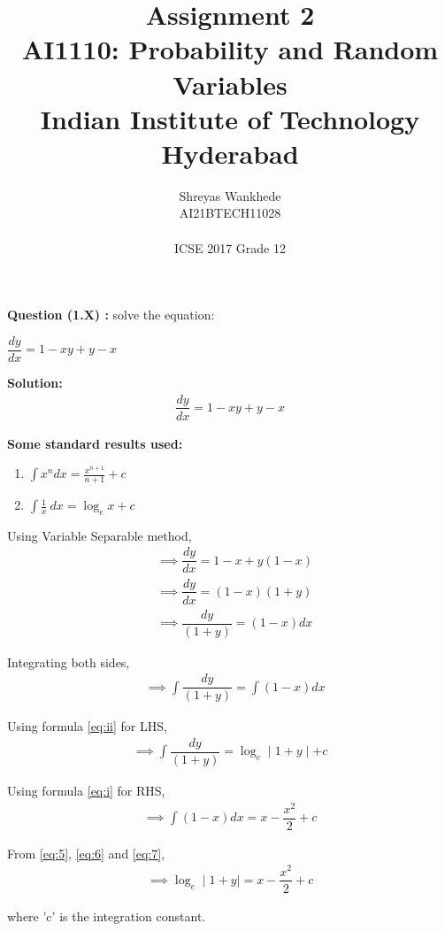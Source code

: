 \documentclass[journal,12pt, two column]{IEEEtran}
\title{Assignment 2\\ \Large AI1110: Probability and Random Variables \\ \large Indian Institute of Technology Hyderabad}
\author{Shreyas Wankhede \\ \normalsize AI21BTECH11028 \\ \vspace*{20pt} \\ \Large ICSE 2017 Grade 12}
\begin{document}
\maketitle

\textbf{Question (1.X) :}
solve the equation:
\begin{center}
$\dfrac{dy}{dx} =1 - xy + y - x$\\
\end{center}

\textbf{Solution:}
\begin{align}
 \dfrac{dy}{dx} =1 - xy + y - x
\end{align}

\textbf{Some standard results used:}
\begin{enumerate}[label=\roman*]
\item $\int x^n dx = \frac{x^{n+1}}{n+1} + c$ \label{eq:i}
\item $\int \frac{1}{x}\ dx = \log_e x + c$ \label{eq:ii}
\end{enumerate}

Using Variable Separable method,
\begin{align}
&\implies\dfrac{dy}{dx} =1 - x + y(1-x)\\
&\implies\dfrac{dy}{dx} =(1-x)(1+y)\\
&\implies\dfrac{dy}{(1+y)} =(1-x)dx
\end{align}

Integrating both sides,
\begin{align}
&\implies\int\dfrac{dy}{(1+y)} =\int(1-x)dx\label{eq:5}
\end{align}

Using formula \eqref{eq:ii} for LHS,
\begin{align}
\implies\int\dfrac{dy}{(1+y)}=\log_e\mid1+y\mid+c\label{eq:6}
\end{align}

Using formula \eqref{eq:i} for RHS,
\begin{align}
\implies\int(1-x)dx=x - \dfrac{x^2}{2} + c\label{eq:7}
\end{align}

From \eqref{eq:5}, \eqref{eq:6} and \eqref{eq:7},
\begin{align}
\implies\log_e\mid1+y\mid = x - \dfrac{x^2}{2} + c\label{eq:8}
\end{align}

where 'c' is the integration constant.
\end{document}
